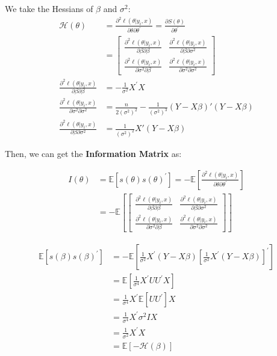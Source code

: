 We take the Hessians of $\beta$ and $\sigma^2$:
\begin{align*}
    \mathcal{H} (\theta ) &= \frac{\partial^2 \ell(\theta |y_i, x)}{\partial \theta \partial \theta ^{\prime}} = \frac{\partial S(\theta )}{\partial \theta^{\prime}}\\
    &= \begin{bmatrix}
        \frac{\partial^2 \ell(\theta |y_i, x)}{\partial \beta \partial \beta} & \frac{\partial^2 \ell(\theta |y_i, x)}{\partial \beta \partial \sigma^2}\\
        \frac{\partial^2 \ell(\theta |y_i, x)}{\partial \sigma^2 \partial \beta} & \frac{\partial^2 \ell(\theta |y_i, x)}{\partial \sigma^2 \partial \sigma^2}
    \end{bmatrix}\\
    \frac{\partial^2 \ell(\theta |y_i, x)}{\partial \beta \partial \beta } &= -\frac{1}{\sigma^2}X^{\prime} X\\
    \frac{\partial^2 \ell(\theta |y_i, x)}{\partial \sigma^2 \partial \sigma^2} &= \frac{n}{2(\sigma^2)^2} - \frac{1}{(\sigma^2)^3} (Y - X\beta )'(Y - X\beta )\\
    \frac{\partial^2 \ell(\theta |y_i, x)}{\partial \beta \partial \sigma^2} &= \frac{1}{(\sigma^2)^2}X'(Y - X\beta )
\end{align*}

    
Then, we can get the \textbf{Information Matrix} as: 
\begin{definition}
    \begin{align*}
        I(\theta ) &= \mathbb{E}[s(\theta )s(\theta )^{\prime}] =  -\mathbb{E}\left[\frac{\partial^2 \ell(\theta |y_i, x)}{\partial \theta \partial \theta ^{\prime}}\right]\\
        &= -\mathbb{E}\left[\begin{bmatrix}
            \frac{\partial^2 \ell(\theta |y_i, x)}{\partial \beta \partial \beta } & \frac{\partial^2 \ell(\theta |y_i, x)}{\partial \beta \partial \sigma^2}\\
            \frac{\partial^2 \ell(\theta |y_i, x)}{\partial \sigma^2 \partial \beta} & \frac{\partial^2 \ell(\theta |y_i, x)}{\partial \sigma^2 \partial \sigma^2}
        \end{bmatrix}\right]
    \end{align*}
\end{definition}

\begin{align*}
    \mathbb{E}[s(\beta )s(\beta )^{\prime} ] &= -\mathbb{E}\left[ \frac{1}{\sigma ^2}X^{\prime}(Y - X\beta)\left[\frac{1}{\sigma^2} X^{\prime} (Y-X\beta) \right]^{\prime} \right]\\
    &= \mathbb{E}\left[\frac{1}{\sigma^4}X^{\prime}U U^{\prime} X\right]\\
    &= \frac{1}{\sigma^4}X^{\prime} \mathbb{E}[U U^{\prime}] X\\
    &= \frac{1}{\sigma^4}X^{\prime} \sigma^2 I X\\
    &= \frac{1}{\sigma^2}X^{\prime}X \\
    &= \mathbb{E}[-\mathcal{H}(\beta )]
\end{align*}

